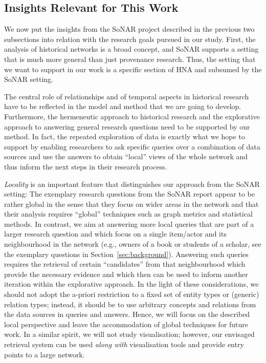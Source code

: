 \subsection{Insights Relevant for This Work}
\label{subsec:insights_from_SoNAR}

We now put the insights from the \gls{SoNAR} project described in the previous two subsections
into relation with the research goals pursued in our study.
First, the analysis of historical networks is a broad concept, and \gls{SoNAR} supports a setting
that is much more general than just provenance research.
Thus, the setting that we want to support in our work is a specific section of \gls{HNA} and subsumed 
by the \gls{SoNAR} setting.

The central role of relationships and of temporal aspects in historical research
have to be reflected in the model and method that we are going to develop.
Furthermore, the hermeneutic approach to historical research
and the explorative approach to answering general research questions 
need to be supported by our method. In fact, the repeated exploration of data
is exactly what we hope to support by enabling researchers to ask specific
queries over a combination of data sources and use the answers to obtain
\enquote{local} views of the whole network and thus inform the next steps in their research process.

\emph{Locality} is an important feature that distinguishes our approach from the \gls{SoNAR} setting:
The exemplary research questions from the \gls{SoNAR} report appear to be rather global
in the sense that they focus on wider areas in the network and that their analysis requires
\enquote{global} techniques such as graph metrics and statistical methods.
In contrast, we aim at answering more local queries
that are part of a larger research question and which 
focus on a single item/actor and its neighbourhood in the network
(e.g., owners of a book or students of a scholar, see the exemplary questions
in Section~\ref{sec:background}). Answering such queries
requires the retrieval of certain \enquote{candidates} from that neighbourhood
which provide the necessary evidence and which then can be used
to inform another iteration within the explorative approach.
In the light of these considerations, 
we should not adopt the a-priori restriction
to a fixed set of entity types or (generic) relation types;
instead, it should be to use arbitrary concepts and relations
from the data sources in queries and answers.
Hence, we will focus on the described local perspective
and leave the accommodation of global techniques for future work.
In a similar spirit, we will not study visualisation;
however, our envisaged retrieval system can be used \emph{along with} visualisation tools
and provide entry points to a large network.

